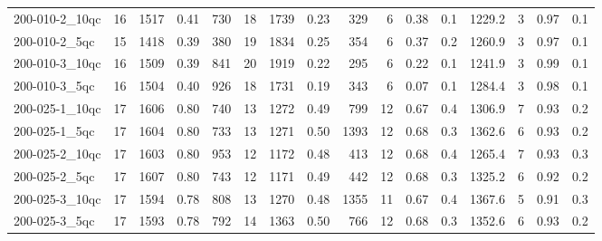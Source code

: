\documentclass[twoside]{article}
\begin{document}
\begin{longtable}{l|rrrr|rrrr|rrr|rrrr}
		200-010-2\_10qc & 16 & 1517 & 0.41 & 730 & 18 & 1739 & 0.23 & 329 & 6 & 0.38 & 0.1 & 1229.2 & 3 & 0.97 & 0.1 \\
		200-010-2\_5qc & 15 & 1418 & 0.39 & 380 & 19 & 1834 & 0.25 & 354 & 6 & 0.37 & 0.2 & 1260.9 & 3 & 0.97 & 0.1 \\
		200-010-3\_10qc & 16 & 1509 & 0.39 & 841 & 20 & 1919 & 0.22 & 295 & 6 & 0.22 & 0.1 & 1241.9 & 3 & 0.99 & 0.1 \\
		200-010-3\_5qc & 16 & 1504 & 0.40 & 926 & 18 & 1731 & 0.19 & 343 & 6 & 0.07 & 0.1 & 1284.4 & 3 & 0.98 & 0.1 \\
		200-025-1\_10qc & 17 & 1606 & 0.80 & 740 & 13 & 1272 & 0.49 & 799 & 12 & 0.67 & 0.4 & 1306.9 & 7 & 0.93 & 0.2 \\
		200-025-1\_5qc & 17 & 1604 & 0.80 & 733 & 13 & 1271 & 0.50 & 1393 & 12 & 0.68 & 0.3 & 1362.6 & 6 & 0.93 & 0.2 \\
		200-025-2\_10qc & 17 & 1603 & 0.80 & 953 & 12 & 1172 & 0.48 & 413 & 12 & 0.68 & 0.4 & 1265.4 & 7 & 0.93 & 0.3 \\
		200-025-2\_5qc & 17 & 1607 & 0.80 & 743 & 12 & 1171 & 0.49 & 442 & 12 & 0.68 & 0.3 & 1325.2 & 6 & 0.92 & 0.2 \\
		200-025-3\_10qc & 17 & 1594 & 0.78 & 808 & 13 & 1270 & 0.48 & 1355 & 11 & 0.67 & 0.4 & 1367.6 & 5 & 0.91 & 0.3 \\
		200-025-3\_5qc & 17 & 1593 & 0.78 & 792 & 14 & 1363 & 0.50 & 766 & 12 & 0.68 & 0.3 & 1352.6 & 6 & 0.93 & 0.2\end{longtable}
	\endgroup
	
	\begingroup
	\fontsize{7pt}{8pt}\selectfont
	\setlength{\tabcolsep}{1pt} %
	
	
	
\end{document}
